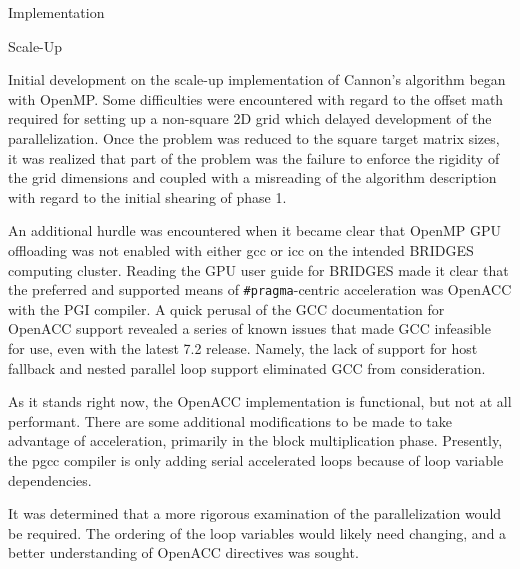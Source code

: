 \documentclass{article}
\begin{document}
\begin{section}{Implementation}
  \begin{subsection}{Scale-Up}
    \begin{paragraph}{}
      Initial development on the scale-up implementation of Cannon's algorithm began with OpenMP. Some difficulties were encountered with regard
      to the offset math required for setting up a non-square 2D grid which delayed development of the parallelization. Once the problem was
      reduced to the square target matrix sizes, it was realized that part of the problem was the failure to enforce the rigidity of the grid dimensions
      and coupled with a misreading of the algorithm description with regard to the initial shearing of phase 1.
    \end{paragraph}
    \begin{paragraph}{}
      An additional hurdle was encountered when it became clear that OpenMP GPU offloading was not enabled with either gcc or icc on the intended
      BRIDGES computing cluster. Reading the GPU user guide for BRIDGES\autocite{BridgesGPUGuide} made it clear that the preferred and supported means of \texttt{\#pragma}-centric
      acceleration was OpenACC with the PGI compiler. A quick perusal of the GCC documentation for OpenACC support\autocite{gccOpenACC} revealed a series
      of known issues that made GCC infeasible for use, even with the latest 7.2 release. Namely, the lack of support for host fallback and nested
      parallel loop support eliminated GCC from consideration.
    \end{paragraph}
    \begin{paragraph}{}
      As it stands right now, the OpenACC implementation is functional, but not at all performant. There are some additional modifications to be made
      to take advantage of acceleration, primarily in the block multiplication phase. Presently, the pgcc compiler is only adding serial accelerated
      loops because of loop variable dependencies.
    \end{paragraph}
    \begin{paragraph}{}
      It was determined that a more rigorous examination of the parallelization would be required. The ordering of the loop variables would likely
      need changing, and a better understanding of OpenACC directives was sought.


\end{paragraph}
\end{subsection}
\end{section}
\end{document}
